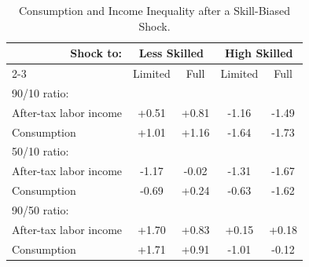 \begin{table}
\centering
\caption{Consumption and Income Inequality after a Skill-Biased Shock.} \label{tab:shock_table}
\begin{tabular}{lcccc}
\hline
\multicolumn{1}{r}{Shock to:} & \multicolumn{2}{c}{Less Skilled} & \multicolumn{2}{c}{High Skilled} \\
\cline{2-3} \cline{4-5}
 & Limited & Full & Limited & Full \\
\hline
90/10 ratio: \\
\quad After-tax labor income & +0.51 & +0.81 & -1.16 & -1.49 \\
\quad Consumption & +1.01 & +1.16 & -1.64 & -1.73 \\
\noalign{\smallskip}
50/10 ratio: \\
\quad After-tax labor income & -1.17 & -0.02 & -1.31 & -1.67 \\
\quad Consumption & -0.69 & +0.24 & -0.63 & -1.62 \\
\noalign{\smallskip}
90/50 ratio: \\
\quad After-tax labor income & +1.70 & +0.83 & +0.15 & +0.18 \\
\quad Consumption & +1.71 & +0.91 & -1.01 & -0.12 \\
\hline
\end{tabular}
\end{table}